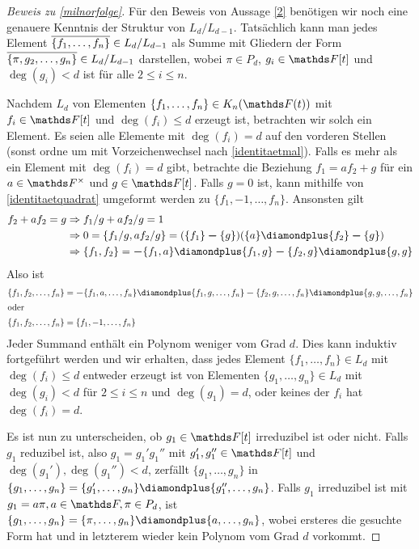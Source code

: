 \documentclass[ngerman,fontsize=11pt, paper=a4, parskip=half, titlepage=true, toc=bib]{scrartcl}
\begin{document}
\begin{proof}[Beweis zu \ref{milnorfolge}]
  Für den Beweis von Aussage \ref{2} benötigen wir noch eine genauere
  Kenntnis der Struktur von $L_d/L_{d-1}$.
  Tatsächlich kann man jedes Element 
  $\overline{\{f_1,\dotsc,f_n\}}\in L_d/L_{d-1}$ als Summe
  mit Gliedern der Form  $\overline{\{\pi,g_2,\dotsc,g_n\}}\in L_d/L_{d-1}$
  darstellen, wobei $\pi\in P_d$, $g_i\in\F[t]$ 
  und $\deg(g_i)<d$ ist für alle $2\leq i\leq n$.
  
  Nachdem $L_d$ von Elementen $\{f_1,\dotsc,f_n\}\in\KnFt$ mit
  $f_i\in\F[t]$ und $\deg(f_i)\leq d$ erzeugt ist, 
  betrachten wir solch ein Element.
  Es seien alle Elemente mit $\deg(f_i)=d$ auf den vorderen Stellen 
  (sonst ordne um mit Vorzeichenwechsel nach \ref{identitaetmal}).
  Falls es mehr als ein Element mit $\deg(f_i)=d$ gibt, betrachte
  die Beziehung $f_1=a f_2 + g$ für ein $a\in\Fx$ und $g\in\F[t]$.
  Falls $g=0$ ist, kann mithilfe von \ref{identitaetquadrat}
  umgeformt werden zu $\{f_1,-1,\dotsc,f_n\}$.
  Ansonsten gilt
  \begin{align*}
    f_2+af_2=g 
    &\Rightarrow f_1/g+af_2/g=1\\
    &\Rightarrow 0=\{f_1/g,af_2/g\}=(\{f_1\}\m\{g\})(\{a\}\p\{f_2\}\m\{g\})\\
    &\Rightarrow \{f_1,f_2\}=\m\{f_1,a\}\p\{f_1,g\}\m\{f_2,g\}\p\{g,g\}
  \end{align*}
  Also ist 
  \begin{align*}
    \{f_1,f_2,\dotsc,f_n\} 
    &=\m \{f_1,a,\dotsc,f_n\}
      \p \{f_1,g,\dotsc,f_n\}
      \m \{f_2,g,\dotsc,f_n\}
      \p \{g,g,\dotsc,f_n\}\\
    \intertext{oder}
    \{f_1,f_2,\dotsc,f_n\} 
    &=\{f_1,-1,\dotsc,f_n\}
  \end{align*}
  Jeder Summand enthält ein Polynom weniger vom Grad $d$.
  Dies kann induktiv fortgeführt werden und wir erhalten,
  dass jedes Element $\{f_1,\dotsc,f_n\}\in L_d$ mit $\deg(f_i)\leq d$
  entweder erzeugt ist von Elementen $\{g_1,\dotsc, g_n\}\in L_d$ mit
  $\deg(g_i)<d$ für $2\leq i\leq n$ und $\deg(g_1)=d$,
  oder keines der $f_i$ hat $\deg(f_i)=d$.
  
  Es ist nun zu unterscheiden, ob $g_1\in\F[t]$ irreduzibel ist oder
  nicht. Falls $g_1$ reduzibel ist, also $g_1=g_1'g_1''$ mit
  $g_1',g_1''\in\F[t]$ und $\deg(g_1'),\deg(g_1'')<d$,
  zerfällt $\{g_1,\dotsc,g_n\}$ in 
  $\{g_1,\dotsc,g_n\}=\{g_1',\dotsc,g_n\}\p\{g_1'',\dotsc,g_n\}$.
  Falls $g_1$ irreduzibel ist mit $g_1=a\pi, a\in\F, \pi\in P_d$, 
  ist $\{g_1,\dotsc,g_n\}=\{\pi,\dotsc,g_n\}\p\{a,\dotsc,g_n\}$,
  wobei ersteres die gesuchte Form hat und in letzterem wieder kein
  Polynom vom Grad $d$ vorkommt.


\end{proof}
\end{document}

